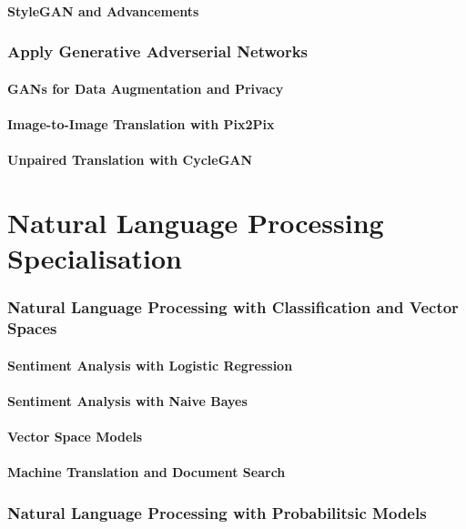 \documentclass[a4paper, 11pt]{book}
\begin{document}
    \subsection{StyleGAN and Advancements}

    \section{Apply Generative Adverserial Networks}
    \subsection{GANs for Data Augmentation and Privacy}
    \subsection{Image-to-Image Translation with Pix2Pix}
    \subsection{Unpaired Translation with CycleGAN}

    \part{Natural Language Processing Specialisation}

    \section{Natural Language Processing with Classification and Vector Spaces}
    \subsection{Sentiment Analysis with Logistic Regression}
    \subsection{Sentiment Analysis with Naive Bayes}
    \subsection{Vector Space Models}
    \subsection{Machine Translation and Document Search}

    \section{Natural Language Processing with Probabilitsic Models}
\end{document}
